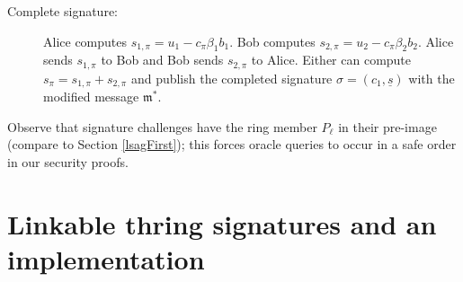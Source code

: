 \documentclass{mrl}
\theoremstyle{definition}
\numberwithin{theorem}{subsection}
\newcommand{\m}{\mathfrak{m}}
\begin{document}
\begin{description}
\item [Complete signature:] Alice computes $s_{1, \pi} = u_1 - c_\pi \beta_1 b_1$. Bob computes $s_{2, \pi} = u_2 - c_\pi \beta_2 b_2$. Alice sends $s_{1, \pi}$ to Bob and Bob sends $s_{2, \pi}$ to Alice.   Either can compute $s_\pi = s_{1, \pi} + s_{2, \pi}$ and publish the completed signature $\sigma = (c_1, \underline{s})$ with the modified message $\m^*$.
\end{description} Observe that signature challenges have the ring member $P_\ell$ in their pre-image (compare to Section \ref{lsagFirst}); this forces oracle queries to occur in a safe order in our security proofs.





\section{Linkable thring signatures and an  implementation}\label{schemeAndImp}

\end{document}
